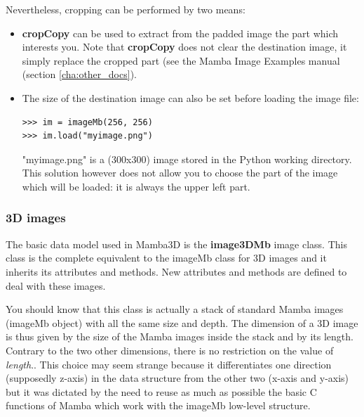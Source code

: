 \documentclass[a4paper,10pt,oneside]{article}
\begin{document}
Nevertheless, cropping can be performed by two means:

\begin{itemize}
\item \textbf{cropCopy} can be used to extract from the padded image the part which interests you. Note that
\textbf{cropCopy} does not clear the destination image, it simply replace the cropped part (see the Mamba
Image Examples manual (section \ref{cha:other_docs}).
\item The size of the destination image can also be set before loading the image file:

\lstset{language=Python}
\begin{lstlisting}
>>> im = imageMb(256, 256)
>>> im.load("myimage.png")
\end{lstlisting}

"myimage.png" is a (300x300) image stored in the Python working directory. This solution however does not allow you
to choose the part of the image which will be loaded: it is always the upper left part.
\end{itemize}


\subsubsection{3D images}

The basic data model used in Mamba3D is the \textbf{image3DMb} image class. This class is the
complete equivalent to the imageMb class for 3D images and it inherits its attributes and methods.
New attributes and methods are defined to deal with these images.

You should know that this class is actually a stack of standard Mamba images
(imageMb object) with all the same size and depth. The dimension of a 3D image
is thus given by the size of the Mamba images inside the stack and by its
length. Contrary to the two other dimensions, there is no restriction
on the value of \textit{length}.. This choice may seem strange because it differentiates one direction
(supposedly z-axis) in the data structure from the other two (x-axis and
y-axis) but it was dictated by the need to reuse as much as possible the 
basic C functions of Mamba which work with the imageMb low-level structure.
\end{document}
